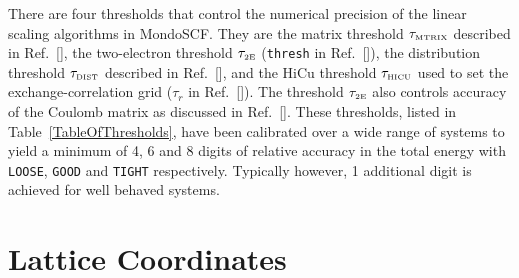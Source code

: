 \documentclass[prb,aps,nobibnotes,twocolumn,doublespace,twocolumngrid,superbib,showpacs]{revtex4}
\begin{document}
There are four thresholds that control the numerical precision of the linear scaling algorithms
in {\sc MondoSCF}.  They are the matrix threshold $\tau_{\rm \scriptscriptstyle MTRIX}$
described in Ref.~[], the two-electron threshold  $\tau_{\rm \scriptscriptstyle 2E}$ ({\tt thresh} in Ref.~[]),
the distribution threshold   $\tau_{\rm \scriptscriptstyle DIST}$ described in Ref.~[],
and the HiCu threshold $\tau_{\rm \scriptscriptstyle HICU}$ used to set the exchange-correlation grid ($\tau_r$ in 
Ref.~[]).  The threshold $\tau_{\rm \scriptscriptstyle 2E}$ also controls accuracy of the
Coulomb matrix as discussed in Ref.~[].
These thresholds, listed in Table~\ref{TableOfThresholds},  have been 
calibrated over a wide range of systems to yield a minimum of  4, 6 and 8 digits of relative accuracy in the total 
energy with {\tt LOOSE}, {\tt GOOD} and {\tt TIGHT} respectively.    Typically however, 1 additional digit is achieved for 
well behaved systems.  

\begin{table}[h]
\caption{Accuracy goals and corresponding thresholds that control precision of the {\sc MondoSCF} linear scaling algorithms.}
\label{TableOfThresholds}
\end{table}

\section{Lattice Coordinates}\label{Coordinates}
%
%
\begin{table}[h]
\caption{Fractional coordinates for the triclinic 2 atom unit cell of MgO, corresponding to the 
         calculations reported in Table~\ref{MgOTable}.  Length of the unit cell is 
         $a=b=c=2.977776807$\AA $\,$ with angles $\alpha=\beta=\gamma=60^\circ$.}
\end{table}
\end{document}
